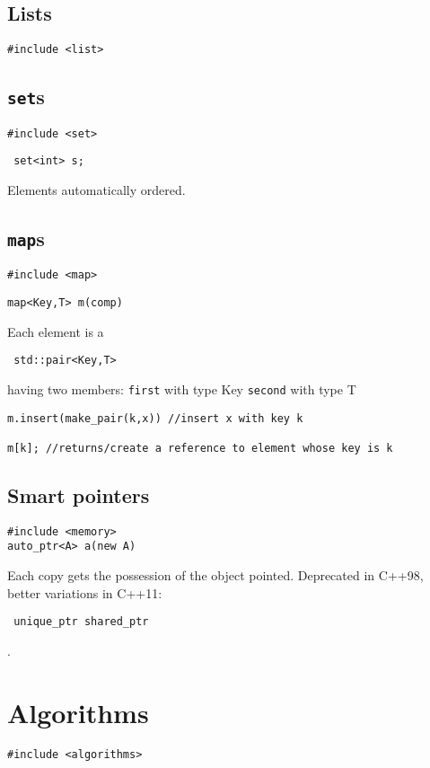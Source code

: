 \documentclass{article}
\newcommand{\code}[1]{\texttt {#1}}
\begin{document}
\subsection{Lists}
\code{\#include <list>}

\subsection{\code{set}s}
\code{\#include <set>}
\begin{lstlisting} set<int> s;\end{lstlisting}
Elements automatically ordered.

\subsection{\code{map}s}
\code{\#include <map>} 
\begin{lstlisting}map<Key,T> m(comp)\end{lstlisting}
Each element is a \begin{lstlisting} std::pair<Key,T> \end{lstlisting} having two members:
\code{first} with type Key
\code{second} with type T
\begin{lstlisting}
m.insert(make_pair(k,x)) //insert x with key k

m[k]; //returns/create a reference to element whose key is k
\end{lstlisting}

\subsection{Smart pointers}
\begin{lstlisting}
#include <memory>
auto_ptr<A> a(new A)
\end{lstlisting}
Each copy gets the possession of the object pointed. Deprecated in C++98, better variations in C++11: 
\begin{lstlisting} 
 unique_ptr shared_ptr 
\end{lstlisting}.






\section{Algorithms}
\begin{lstlisting}
#include <algorithms>
\end{lstlisting}
\end{document}
